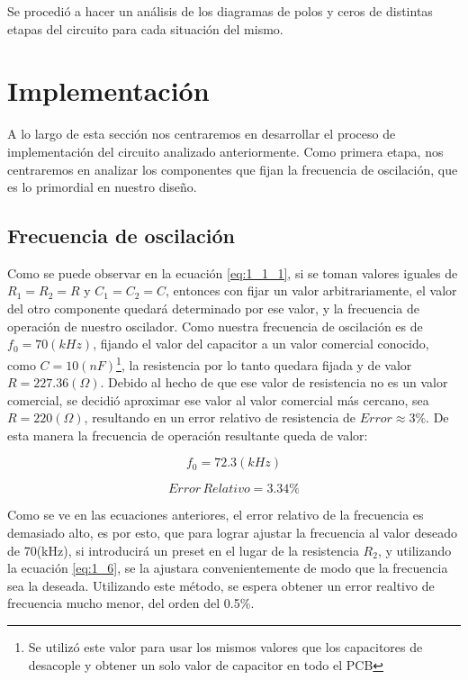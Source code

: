 Se procedió a hacer un análisis de los diagramas de polos y ceros
de distintas etapas del circuito para cada situación del mismo.

\section{Implementación}

A lo largo de esta sección nos centraremos en desarrollar el proceso
de implementación del circuito analizado anteriormente. Como primera
etapa, nos centraremos en analizar los componentes que fijan la frecuencia
de oscilación, que es lo primordial en nuestro diseño.

\subsection{Frecuencia de oscilación}

Como se puede observar en la ecuación \ref{eq:1_1_1}, si se toman
valores iguales de $R_{1}=R_{2}=R$ y $C_{1}=C_{2}=C$, entonces con
fijar un valor arbitrariamente, el valor del otro componente quedará
determinado por ese valor, y la frecuencia de operación de nuestro
oscilador. Como nuestra frecuencia de oscilación es de $f_{0}=70\left(kHz\right)$,
fijando el valor del capacitor a un valor comercial conocido, como
$C=10\left(nF\right)$\footnote{Se utilizó este valor para usar los mismos valores que los capacitores
de desacople y obtener un solo valor de capacitor en todo el PCB}, la resistencia por lo tanto quedara fijada y de valor $R=227.36\left(\Omega\right)$.
Debido al hecho de que ese valor de resistencia no es un valor comercial,
se decidió aproximar ese valor al valor comercial más cercano, sea
$R=220(\Omega)$, resultando en un error relativo de resistencia de
$Error\approx3\%$. De esta manera la frecuencia de operación resultante
queda de valor:

\[
f_{0}=72.3\left(kHz\right)
\]

\[
Error\,Relativo=3.34\%
\]

Como se ve en las ecuaciones anteriores, el error relativo de la frecuencia
es demasiado alto, es por esto, que para lograr ajustar la frecuencia
al valor deseado de 70(kHz), si introducirá un preset en el lugar
de la resistencia $R_{2}$, y utilizando la ecuación \ref{eq:1_6},
se la ajustara convenientemente de modo que la frecuencia sea la deseada.
Utilizando este método, se espera obtener un error realtivo de frecuencia
mucho menor, del orden del 0.5\%.


